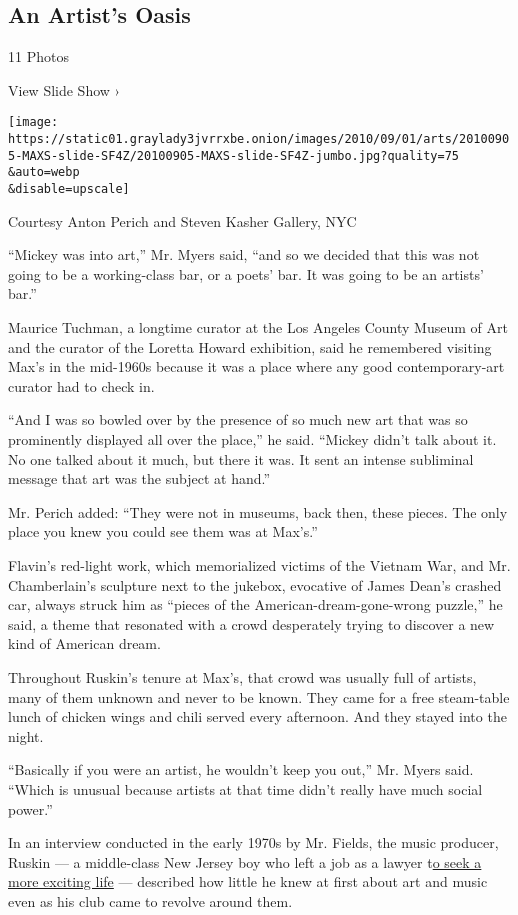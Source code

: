 \hypertarget{an-artists-oasis}{%
\subsection{An Artist's Oasis}\label{an-artists-oasis}}

11 Photos

View Slide Show ›

\texttt{[image: https://static01.graylady3jvrrxbe.onion/images/2010/09/01/arts/20100905-MAXS-slide-SF4Z/20100905-MAXS-slide-SF4Z-jumbo.jpg?quality=75\\\&auto=webp\\\&disable=upscale]}

Courtesy Anton Perich and Steven Kasher Gallery, NYC

``Mickey was into art,'' Mr. Myers said, ``and so we decided that this
was not going to be a working-class bar, or a poets' bar. It was going
to be an artists' bar.''

Maurice Tuchman, a longtime curator at the Los Angeles County Museum of
Art and the curator of the Loretta Howard exhibition, said he remembered
visiting Max's in the mid-1960s because it was a place where any good
contemporary-art curator had to check in.

``And I was so bowled over by the presence of so much new art that was
so prominently displayed all over the place,'' he said. ``Mickey didn't
talk about it. No one talked about it much, but there it was. It sent an
intense subliminal message that art was the subject at hand.''

Mr. Perich added: ``They were not in museums, back then, these pieces.
The only place you knew you could see them was at Max's.''

Flavin's red-light work, which memorialized victims of the Vietnam War,
and Mr. Chamberlain's sculpture next to the jukebox, evocative of James
Dean's crashed car, always struck him as ``pieces of the
American-dream-gone-wrong puzzle,'' he said, a theme that resonated with
a crowd desperately trying to discover a new kind of American dream.

Throughout Ruskin's tenure at Max's, that crowd was usually full of
artists, many of them unknown and never to be known. They came for a
free steam-table lunch of chicken wings and chili served every
afternoon. And they stayed into the night.

``Basically if you were an artist, he wouldn't keep you out,'' Mr. Myers
said. ``Which is unusual because artists at that time didn't really have
much social power.''

In an interview conducted in the early 1970s by Mr. Fields, the music
producer, Ruskin --- a middle-class New Jersey boy who left a job as a
lawyer
t\href{http://www.nytimes3xbfgragh.onion/2003/05/11/nyregion/neighborhood-report-union-square-archetypal-host.html}{o
seek a more exciting life} --- described how little he knew at first
about art and music even as his club came to revolve around them.

